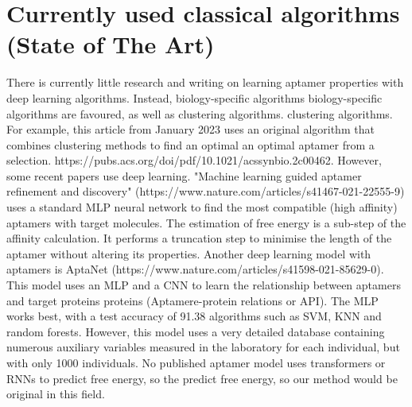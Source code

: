 \documentclass{article}
\begin{document}
\section*{Currently used classical algorithms (State of The Art)}
There is currently little research and writing on learning 
aptamer properties with deep learning algorithms. Instead, biology-specific algorithms 
biology-specific algorithms are favoured, as well as clustering algorithms. 
clustering algorithms. For example, this article from January 2023 uses 
an original algorithm that combines clustering methods to find an optimal 
an optimal aptamer from a selection. 
https://pubs.acs.org/doi/pdf/10.1021/acssynbio.2c00462.
However, some recent papers use deep learning. 
"Machine learning guided aptamer refinement 
and discovery" (https://www.nature.com/articles/s41467-021-22555-9) 
uses a standard MLP neural network to find the most compatible (high affinity) aptamers with target molecules. The estimation of free energy is a sub-step of the affinity calculation. It performs a 
truncation step to minimise the length of the aptamer without altering its properties. 
Another deep learning model with aptamers is AptaNet 
(https://www.nature.com/articles/s41598-021-85629-0). This model uses an 
MLP and a CNN to learn the relationship between aptamers and target proteins 
proteins (Aptamere-protein relations or API). The MLP works best, with a 
test accuracy of 91.38%
algorithms such as SVM, KNN and random forests. However, this model 
uses a very detailed database containing numerous auxiliary variables 
measured in the laboratory for each individual, but with only 1000 individuals. 
No published aptamer model uses transformers or RNNs to predict free energy, so the 
predict free energy, so our method would be original in this field.



\end{document}
